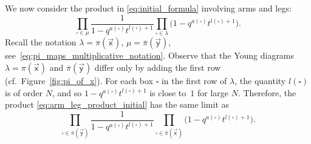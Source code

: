 \documentclass[11pt]{article}
\numberwithin{equation}{section}
\numberwithin{equation}{section}
\begin{document}
We now consider the product
in \eqref{eq:initial_formula}
involving arms and legs:
\begin{equation}
	\label{eq:arm_leg_product_initial}
	\prod_{\square\in \mu}
	\frac{1}
	{1-q^{a(\square)}t^{l(\square)+1}}
	\prod_{\square\in \lambda}
	\bigl(1-q^{a(\square)}t^{l(\square)+1}\bigr).
\end{equation}
Recall the notation
$\lambda=\pi(\vec{\mathsf{x}})$,
$\mu=\overline\pi(\vec{\mathsf{y}})$, see~\eqref{eq:pi_maps_multiplicative_notation}.
Observe that the Young diagrams
$\lambda=\pi(\vec{\mathsf{x}})$ and
$\overline\pi(\vec{\mathsf{y}})$ differ only by
adding the first row (cf.\ Figure~\ref{fig:pi_of_x}).
For each box $\square$ in the first row of $\lambda$, the quantity
$l(\square)$ is of order $N$, and so
$1-q^{a(\square)}t^{l(\square)+1}$ is close to~$1$
for large $N$.
Therefore, the product
\eqref{eq:arm_leg_product_initial}
has the same limit as
\begin{equation}	\label{eq:arm_leg_product_proof_1}
	\prod_{\square\in \overline\pi(\vec{\mathsf{y}})}
	\frac{1}
	{1-q^{a(\square)}t^{l(\square)+1}}
	\prod_{\square\in \overline\pi(\vec{\mathsf{x}})}
	\bigl(1-q^{a(\square)}t^{l(\square)+1}\bigr).
\end{equation}
\end{document}
